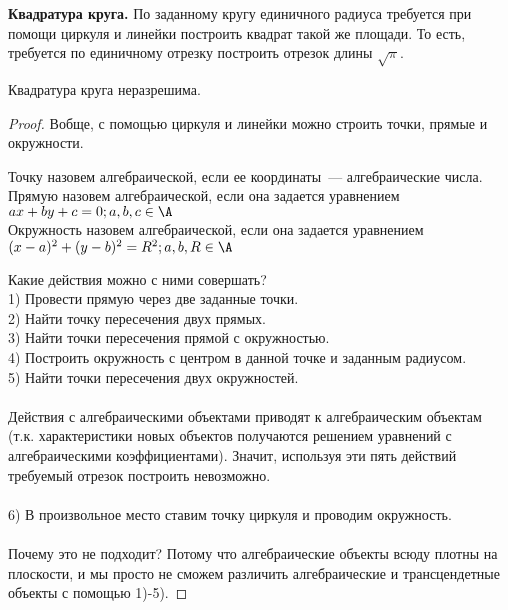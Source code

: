 \textbf{Квадратура круга.} По заданному кругу единичного радиуса требуется при помощи циркуля и линейки построить квадрат такой же площади. То есть, требуется по единичному отрезку построить отрезок длины $\sqrt{\pi}$.
\begin{theorem}
Квадратура круга неразрешима.
\end{theorem}
\begin{proof}
Вобще, с помощью циркуля и линейки можно строить точки, прямые и окружности.
\begin{df}
Точку назовем алгебраической, если ее координаты~— алгебраические числа.\\
Прямую назовем алгебраической, если она задается уравнением\\ $ax + by +c = 0; a,b,c \in \A$\\
Окружность назовем алгебраической, если она задается уравнением\\ $(x - a)^2 + (y - b)^2 = R^2; a,b,R \in \A$
\end{df}
Какие действия можно с ними совершать?\\
1) Провести прямую через две заданные точки.\\
2) Найти точку пересечения двух прямых.\\
3) Найти точки пересечения прямой с окружностью.\\
4) Построить окружность с центром в данной точке и заданным радиусом.\\
5) Найти точки пересечения двух окружностей.\\\\
Действия с алгебраическими объектами приводят к алгебраическим объектам (т.к. характеристики новых объектов получаются решением уравнений с алгебраическими коэффициентами). Значит, используя эти пять действий требуемый отрезок построить невозможно.\\\\
6) В произвольное место ставим точку циркуля и проводим окружность.\\\\
Почему это не подходит? Потому что алгебраические объекты всюду плотны на плоскости, и мы просто не сможем различить алгебраические и трансцендетные объекты с помощью 1)-5).
\end{proof}
% 
